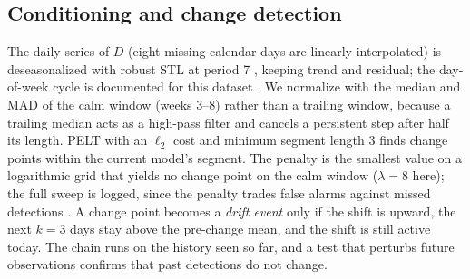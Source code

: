 \documentclass[conference]{IEEEtran}
\begin{document}
\subsection{Conditioning and change detection}
The daily series of $D$ (eight missing calendar days are linearly interpolated) is deseasonalized with robust STL at period 7 \cite{cleveland1990}, keeping trend and residual; the day-of-week cycle is documented for this dataset \cite{jancicka2024}. We normalize with the median and MAD of the calm window (weeks 3--8) rather than a trailing window, because a trailing median acts as a high-pass filter and cancels a persistent step after half its length. PELT with an $\ell_2$ cost and minimum segment length 3 \cite{killick2012} finds change points within the current model's segment. The penalty is the smallest value on a logarithmic grid that yields no change point on the calm window ($\lambda=8$ here); the full sweep is logged, since the penalty trades false alarms against missed detections \cite{smirnov2023}. A change point becomes a \emph{drift event} only if the shift is upward, the next $k=3$ days stay above the pre-change mean, and the shift is still active today. The chain runs on the history seen so far, and a test that perturbs future observations confirms that past detections do not change.
\end{document}
